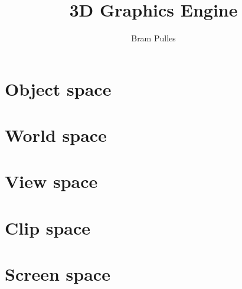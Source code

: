 \documentclass[a4paper]{article}
\author{Bram Pulles}
\title{\Huge\textbf{3D Graphics Engine}}
\begin{document}
\maketitle

\tableofcontents

\pagebreak
\section{Object space}

\section{World space}

\section{View space}

\section{Clip space}

\section{Screen space}
\end{document}
